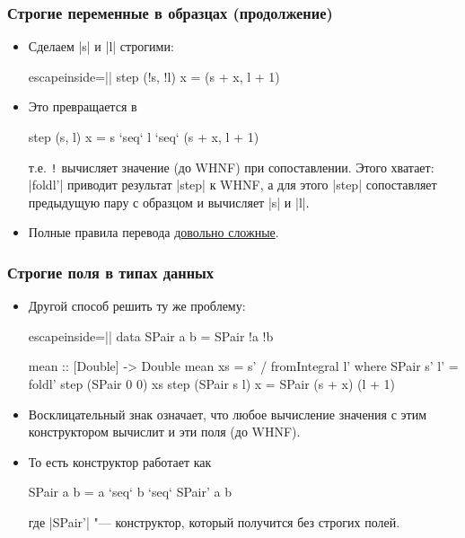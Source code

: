 \documentclass[11pt]{beamer}
\begin{document}
\begin{frame}[fragile]
  \frametitle{Строгие переменные в образцах (продолжение)}
  \begin{itemize}
    \item Сделаем \haskinline|s| и \haskinline|l| строгими:
          \begin{haskell*}{escapeinside=||}
            step (!s, !l) x = (s + x, l + 1)
          \end{haskell*}
    \item Это превращается в
          \begin{haskell}
            step (s, l) x = s `seq` l `seq` (s + x, l + 1)
          \end{haskell}
          т.е. \texttt{!} вычисляет значение (до WHNF) при сопоставлении. Этого хватает: \haskinline|foldl'| приводит результат \haskinline|step| к WHNF, а для этого \haskinline|step| сопоставляет предыдущую пару с образцом и вычисляет \haskinline|s| и \haskinline|l|.
    \item Полные правила перевода \href{https://downloads.haskell.org/~ghc/latest/docs/html/users_guide/exts/strict.html#bang-patterns-informal}{довольно сложные}.
  \end{itemize}
\end{frame}

\begin{frame}[fragile]
  \frametitle{Строгие поля в типах данных}
  \begin{itemize}
    \item Другой способ решить ту же проблему:
          \begin{haskellsmall*}{escapeinside=||}
            data SPair a b = SPair !a !b

            mean :: [Double] -> Double
            mean xs = s' / fromIntegral l'
              where SPair s' l' = foldl' step (SPair 0 0) xs
                    step (SPair s l) x = SPair (s + x) (l + 1)
          \end{haskellsmall*}
          \pause
    \item Восклицательный знак означает, что любое вычисление значения с этим конструктором вычислит и эти поля (до WHNF).
    \item То есть конструктор работает как
          \begin{haskell}
            SPair a b = a `seq` b `seq` SPair' a b
          \end{haskell}
          где \haskinline|SPair'| "--- конструктор, который получится без строгих полей.
  \end{itemize}
\end{frame}
\end{document}

